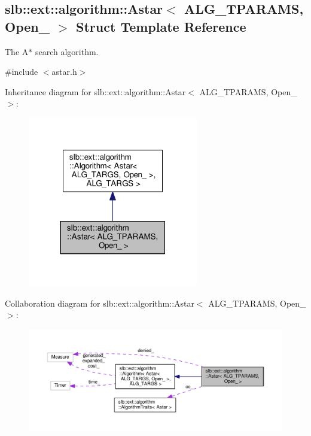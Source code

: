 \hypertarget{structslb_1_1ext_1_1algorithm_1_1Astar}{}\subsection{slb\+:\+:ext\+:\+:algorithm\+:\+:Astar$<$ A\+L\+G\+\_\+\+T\+P\+A\+R\+A\+MS, Open\+\_\+ $>$ Struct Template Reference}
\label{structslb_1_1ext_1_1algorithm_1_1Astar}


The {\ttfamily A$\ast$} search algorithm.  




{\ttfamily \#include $<$astar.\+h$>$}



Inheritance diagram for slb\+:\+:ext\+:\+:algorithm\+:\+:Astar$<$ A\+L\+G\+\_\+\+T\+P\+A\+R\+A\+MS, Open\+\_\+ $>$\+:\nopagebreak
\begin{figure}[H]
\begin{center}
\leavevmode
\includegraphics[width=211pt]{structslb_1_1ext_1_1algorithm_1_1Astar__inherit__graph}
\end{center}
\end{figure}


Collaboration diagram for slb\+:\+:ext\+:\+:algorithm\+:\+:Astar$<$ A\+L\+G\+\_\+\+T\+P\+A\+R\+A\+MS, Open\+\_\+ $>$\+:\nopagebreak
\begin{figure}[H]
\begin{center}
\leavevmode
\includegraphics[width=350pt]{structslb_1_1ext_1_1algorithm_1_1Astar__coll__graph}
\end{center}
\end{figure}
